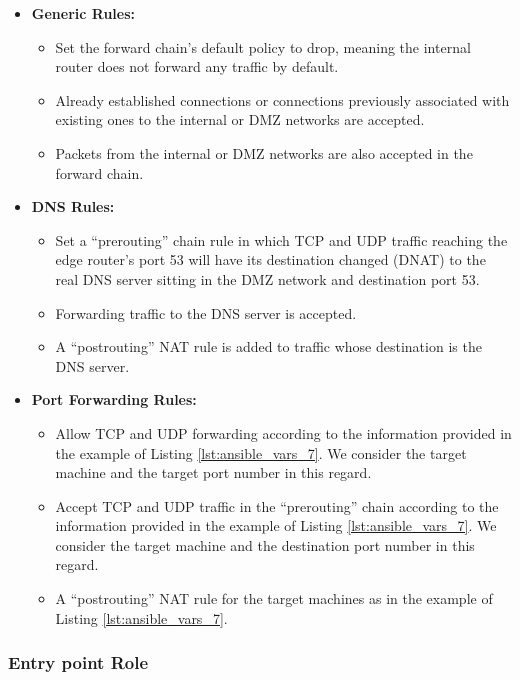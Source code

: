 \begin{itemize}
    \item \textbf{Generic Rules:}
        \begin{itemize}
            \item Set the forward chain's default policy to drop, meaning the internal router does not forward any traffic by default.
            \item Already established connections or connections previously associated with existing ones to the internal or DMZ networks are accepted.
            \item Packets from the internal or DMZ networks are also accepted in the forward chain.
        \end{itemize}
    \item \textbf{DNS Rules:}
        \begin{itemize}
            \item Set a ``prerouting'' chain rule in which TCP and UDP traffic reaching the edge router's port 53 will have its destination changed (DNAT) to the real DNS server sitting in the DMZ network and destination port 53.
            \item Forwarding traffic to the DNS server is accepted.
            \item A ``postrouting'' NAT rule is added to traffic whose destination is the DNS server.
        \end{itemize}
    \item \textbf{Port Forwarding Rules:}
        \begin{itemize}
            \item Allow TCP and UDP forwarding according to the information provided in the example of Listing \ref{lst:ansible_vars_7}. We consider the target machine and the target port number in this regard.
            \item Accept TCP and UDP traffic in the ``prerouting'' chain according to the information provided in the example of Listing \ref{lst:ansible_vars_7}. We consider the target machine and the destination port number in this regard.
            \item A ``postrouting'' NAT rule for the target machines as in the example of Listing \ref{lst:ansible_vars_7}.
        \end{itemize}
\end{itemize}

\subsubsection{Entry point Role} \label{sec:ansible_entrypoint_role}

